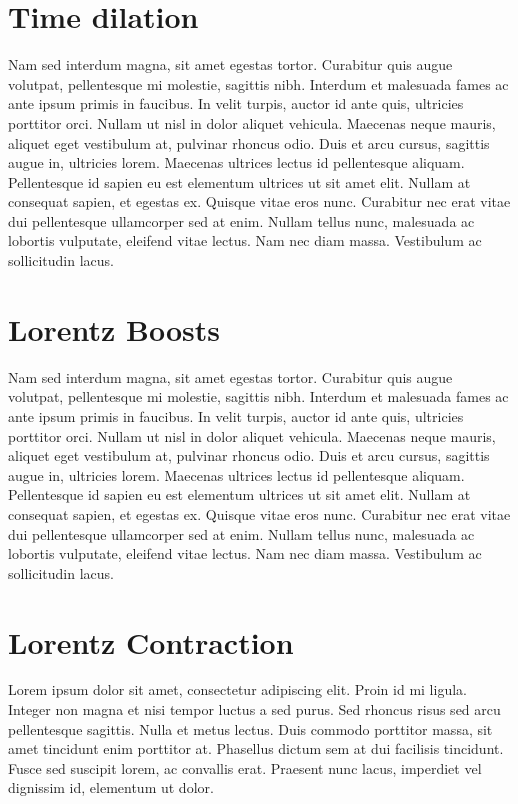 \documentclass[natbib]{muthesis}
\begin{document}
  \section{Time dilation}
  Nam sed interdum magna, sit amet egestas tortor. Curabitur quis augue volutpat, pellentesque mi molestie, sagittis nibh. Interdum et malesuada fames ac ante ipsum primis in faucibus. In velit turpis, auctor id ante quis, ultricies porttitor orci. Nullam ut nisl in dolor aliquet vehicula. Maecenas neque mauris, aliquet eget vestibulum at, pulvinar rhoncus odio. Duis et arcu cursus, sagittis augue in, ultricies lorem. Maecenas ultrices lectus id pellentesque aliquam. Pellentesque id sapien eu est elementum ultrices ut sit amet elit. Nullam at consequat sapien, et egestas ex. Quisque vitae eros nunc. Curabitur nec erat vitae dui pellentesque ullamcorper sed at enim. Nullam tellus nunc, malesuada ac lobortis vulputate, eleifend vitae lectus. Nam nec diam massa. Vestibulum ac sollicitudin lacus.


  \section{Lorentz Boosts}
  Nam sed interdum magna, sit amet egestas tortor. Curabitur quis augue volutpat, pellentesque mi molestie, sagittis nibh. Interdum et malesuada fames ac ante ipsum primis in faucibus. In velit turpis, auctor id ante quis, ultricies porttitor orci. Nullam ut nisl in dolor aliquet vehicula. Maecenas neque mauris, aliquet eget vestibulum at, pulvinar rhoncus odio. Duis et arcu cursus, sagittis augue in, ultricies lorem. Maecenas ultrices lectus id pellentesque aliquam. Pellentesque id sapien eu est elementum ultrices ut sit amet elit. Nullam at consequat sapien, et egestas ex. Quisque vitae eros nunc. Curabitur nec erat vitae dui pellentesque ullamcorper sed at enim. Nullam tellus nunc, malesuada ac lobortis vulputate, eleifend vitae lectus. Nam nec diam massa. Vestibulum ac sollicitudin lacus.

  \section{Lorentz Contraction}
  Lorem ipsum dolor sit amet, consectetur adipiscing elit. Proin id mi ligula. Integer non magna et nisi tempor luctus a sed purus. Sed rhoncus risus sed arcu pellentesque sagittis. Nulla et metus lectus. Duis commodo porttitor massa, sit amet tincidunt enim porttitor at. Phasellus dictum sem at dui facilisis tincidunt. Fusce sed suscipit lorem, ac convallis erat. Praesent nunc lacus, imperdiet vel dignissim id, elementum ut dolor.
\end{document}
